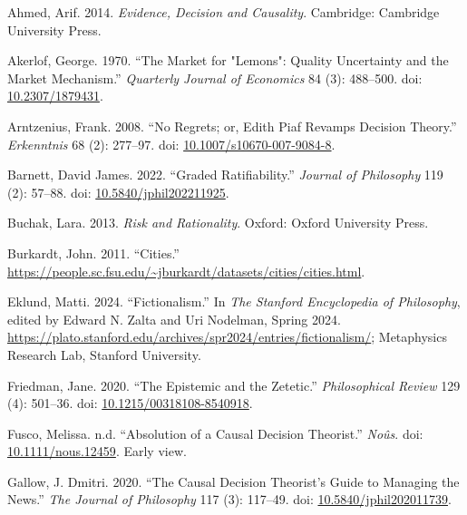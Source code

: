 \documentclass[
  11pt,
  letterpaper,
  DIV=11,
  numbers=noendperiod,
  twoside]{scrartcl}
\newlength{\cslhangindent}
\newenvironment{CSLReferences}[2] %
 {\begin{list}{}{%
  \setlength{\itemindent}{0pt}
  \setlength{\leftmargin}{0pt}
  \setlength{\parsep}{0pt}
  \ifodd #1
   \setlength{\leftmargin}{\cslhangindent}
   \setlength{\itemindent}{-1\cslhangindent}
  \fi
  \setlength{\itemsep}{#2\baselineskip}}}
 {\end{list}}
\begin{document}
\label{refs}
\begin{CSLReferences}{1}{0}
Ahmed, Arif. 2014. \emph{Evidence, Decision and Causality}. Cambridge:
{C}ambridge {U}niversity {P}ress.

Akerlof, George. 1970. {``The Market for "Lemons": Quality Uncertainty
and the Market Mechanism.''} \emph{Quarterly Journal of Economics} 84
(3): 488--500. doi:
\href{https://doi.org/10.2307/1879431}{10.2307/1879431}.

Arntzenius, Frank. 2008. {``No Regrets; or, Edith Piaf Revamps Decision
Theory.''} \emph{Erkenntnis} 68 (2): 277--97. doi:
\href{https://doi.org/10.1007/s10670-007-9084-8}{10.1007/s10670-007-9084-8}.

Barnett, David James. 2022. {``Graded Ratifiability.''} \emph{Journal of
Philosophy} 119 (2): 57--88. doi:
\href{https://doi.org/10.5840/jphil202211925}{10.5840/jphil202211925}.

Buchak, Lara. 2013. \emph{Risk and Rationality}. Oxford: Oxford
University Press.

Burkardt, John. 2011. {``Cities.''}
\url{https://people.sc.fsu.edu/~jburkardt/datasets/cities/cities.html}.

Eklund, Matti. 2024. {``{Fictionalism}.''} In \emph{The {Stanford}
Encyclopedia of Philosophy}, edited by Edward N. Zalta and Uri Nodelman,
{S}pring 2024.
\url{https://plato.stanford.edu/archives/spr2024/entries/fictionalism/};
Metaphysics Research Lab, Stanford University.

Friedman, Jane. 2020. {``The Epistemic and the Zetetic.''}
\emph{Philosophical Review} 129 (4): 501--36. doi:
\href{https://doi.org/10.1215/00318108-8540918}{10.1215/00318108-8540918}.

Fusco, Melissa. n.d. {``Absolution of a Causal Decision Theorist.''}
\emph{No{û}s}. doi:
\href{https://doi.org/10.1111/nous.12459}{10.1111/nous.12459}. Early
view.

Gallow, J. Dmitri. 2020. {``The Causal Decision Theorist's Guide to
Managing the News.''} \emph{The Journal of Philosophy} 117 (3): 117--49.
doi:
\href{https://doi.org/10.5840/jphil202011739}{10.5840/jphil202011739}.


\end{CSLReferences}
\end{document}
